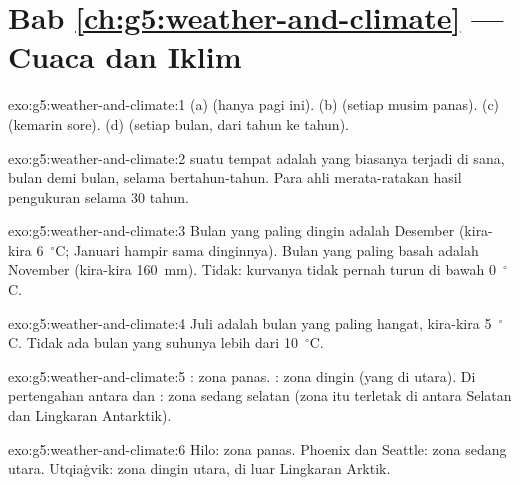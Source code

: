 \section*{Bab \ref{ch:g5:weather-and-climate} --- Cuaca dan Iklim}

\begin{solution}{exo:g5:weather-and-climate:1}
(a)  (hanya pagi ini). (b)  (setiap musim panas). (c) 
(kemarin sore). (d)  (setiap bulan, dari tahun ke tahun).
\end{solution}

\begin{solution}{exo:g5:weather-and-climate:2}
 suatu tempat adalah  yang biasanya terjadi di sana, bulan demi
bulan, selama bertahun-tahun. Para ahli  merata-ratakan hasil
pengukuran selama 30 tahun.
\end{solution}

\begin{solution}{exo:g5:weather-and-climate:3}
Bulan yang paling dingin adalah Desember (kira-kira 6~$^\circ$C; Januari
hampir sama dinginnya). Bulan yang paling basah adalah November (kira-kira
160~mm). Tidak: kurvanya tidak pernah turun di bawah 0~$^\circ$C.
\end{solution}

\begin{solution}{exo:g5:weather-and-climate:4}
Juli adalah bulan yang paling hangat, kira-kira 5~$^\circ$C. Tidak ada
bulan yang suhunya lebih dari 10~$^\circ$C.
\end{solution}

\begin{solution}{exo:g5:weather-and-climate:5}
: zona panas. : zona dingin (yang di utara). Di
pertengahan antara  dan : zona sedang selatan
(zona itu terletak di antara  Selatan dan Lingkaran Antarktik).
\end{solution}

\begin{solution}{exo:g5:weather-and-climate:6}
Hilo: zona panas. Phoenix dan Seattle: zona sedang utara. Utqiaġvik: zona
dingin utara, di luar Lingkaran Arktik.
\end{solution}

